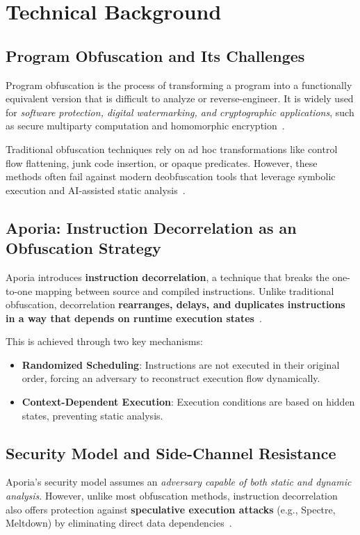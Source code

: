 \section{Technical Background}

\subsection{Program Obfuscation and Its Challenges}
Program obfuscation is the process of transforming a program into a functionally equivalent version that is difficult to analyze or reverse-engineer. It is widely used for \textit{software protection, digital watermarking, and cryptographic applications}, such as secure multiparty computation and homomorphic encryption~\cite{ajorian2024aporia}. 

Traditional obfuscation techniques rely on ad hoc transformations like control flow flattening, junk code insertion, or opaque predicates. However, these methods often fail against modern deobfuscation tools that leverage symbolic execution and AI-assisted static analysis~\cite{ajorian2024aporia}. 

\subsection{Aporia: Instruction Decorrelation as an Obfuscation Strategy}
Aporia introduces \textbf{instruction decorrelation}, a technique that breaks the one-to-one mapping between source and compiled instructions. Unlike traditional obfuscation, decorrelation \textbf{rearranges, delays, and duplicates instructions in a way that depends on runtime execution states}~\cite{ajorian2024aporia}. 

This is achieved through two key mechanisms:
\begin{itemize}
    \item \textbf{Randomized Scheduling}: Instructions are not executed in their original order, forcing an adversary to reconstruct execution flow dynamically.
    \item \textbf{Context-Dependent Execution}: Execution conditions are based on hidden states, preventing static analysis.
\end{itemize}

\subsection{Security Model and Side-Channel Resistance}
Aporia’s security model assumes an \textit{adversary capable of both static and dynamic analysis}. However, unlike most obfuscation methods, instruction decorrelation also offers protection against \textbf{speculative execution attacks} (e.g., Spectre, Meltdown) by eliminating direct data dependencies~\cite{ajorian2024aporia}. 

